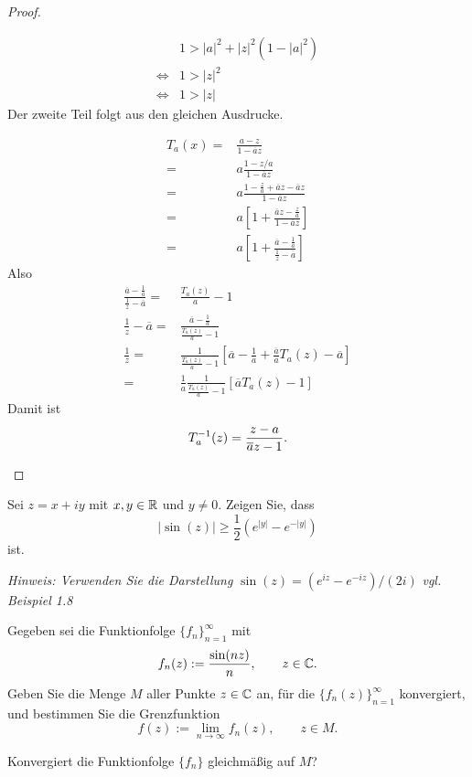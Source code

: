 \begin{proof}
\begin{parts}
\begin{align*}
			&1>|a|^2+|z|^2(1-|a|^2)\\
			\iff&1>|z|^2\\
			\iff& 1>|z|
		\end{align*}
		Der zweite Teil folgt aus den gleichen Ausdrucke.
	\item 
\begin{align*}
			T_a(x)=&\frac{a-z}{1-\overline{a}z}\\
			=& a \frac{1-z / a}{1-\overline{a}z}\\
			=&a \frac{1-\frac{z}{a}+\overline{a}z-\overline{a}z}{1-\overline{a}z}\\
			=&a\left[ 1+ \frac{\overline{a}z-\frac{z}{a}}{1-\overline{a}z} \right]\\
			=&a\left[ 1+\frac{\overline{a}-\frac{1}{a}}{\frac{1}{z}-\overline{a}} \right] 
		\end{align*}
		Also
		\begin{align*}
			\frac{\overline{a}-\frac{1}{a}}{\frac{1}{z}-\overline{a}}=& \frac{T_a(z)}{a}-1\\
			\frac{1}{z}-\overline{a}=&\frac{\overline{a}-\frac{1}{a}}{\frac{T_a(z)}{a}-1}\\
			\frac{1}{z}=&\frac{1}{\frac{T_a(z)}{a}-1}\left[ \overline{a}-\frac{1}{a}+\frac{\overline{a}}{a}T_a(z)-\overline{a} \right] \\
			=&\frac{1}{a}\frac{1}{\frac{T_a(z)}{a}-1}\left[ \overline{a}T_a(z)-1 \right] 
		\end{align*}
		Damit ist
		\[
		T_a^{-1}(z)=\frac{z-a}{\overline{a}z-1}
		.\qedhere\] 
	\end{parts}
\end{proof}
\begin{Problem}
	\begin{parts}
	\item Sei $z=x+iy$ mit $x,y\in \mathbb{R}$ und $y\neq 0$. Zeigen Sie, dass
		\[
		|\sin(z)|\ge \frac{1}{2}(e^{|y|}-e^{-|y|})
		\]
		ist.

		{\footnotesize \emph{Hinweis: Verwenden Sie die Darstellung }$\sin(z)=(e^{iz}-e^{-iz}) / (2i)$ \emph{vgl. Beispiel 1.8}}
	\item Gegeben sei die Funktionfolge $\{f_n\}_{n=1}^\infty$ mit
		\[
		f_n(z):=\frac{\sin(nz)}{n},\qquad z\in \mathbb{C}.\] 
		Geben Sie die Menge $M$ aller Punkte $z\in \mathbb{C}$ an, f\"{u}r die $\{f_n(z)\}_{n=1}^\infty$ konvergiert, und bestimmen Sie die Grenzfunktion
		\[
		f(z):=\lim_{n \to \infty} f_n(z),\qquad z\in M
		.\] 
	\item Konvergiert die Funktionfolge $\{f_n\} $ gleichm\"{a}ßig auf $M$?
	\end{parts}
\end{Problem}
